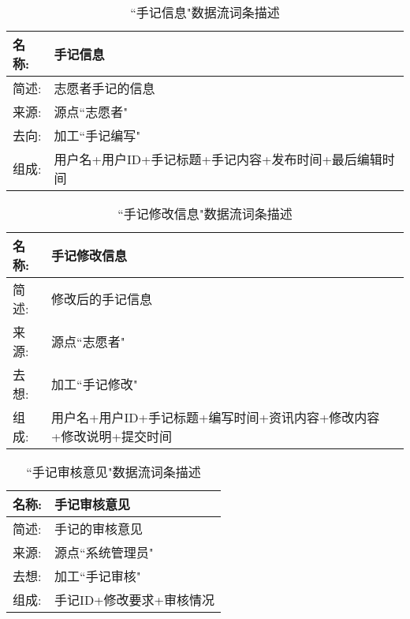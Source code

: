 \begin{table}[H]  
\caption{``手记信息"数据流词条描述}  
\begin{center}  
    \begin{tabular}{l p{11cm}} 
        \hline
        \quad 名称:  &  手记信息 \\
        \hline
        \quad 简述:  & 志愿者手记的信息 \\
        \hline
        \quad 来源:  & 源点``志愿者" \\
        \hline
        \quad 去向:  & 加工``手记编写" \\
        \hline
        \quad 组成:  & 用户名+用户ID+手记标题+手记内容+发布时间+最后编辑时间 \\
        \hline
    \end{tabular}
    \label{tab1}
\end{center}
\end{table}

\begin{table}[H]  
\caption{``手记修改信息"数据流词条描述}  
\begin{center}  
    \begin{tabular}{l p{11cm}} 
        \hline
        \quad 名称:  &   手记修改信息 \\
        \hline
        \quad 简述:  & 修改后的手记信息 \\
        \hline
        \quad 来源:  & 源点``志愿者" \\
        \hline
        \quad 去想:  & 加工``手记修改" \\
        \hline
        \quad 组成:  & 用户名+用户ID+手记标题+编写时间+资讯内容+修改内容+修改说明+提交时间 \\
        \hline
    \end{tabular}
    \label{tab1}
\end{center}
\end{table}

\begin{table}[H]  
\caption{``手记审核意见"数据流词条描述}  
\begin{center}  
    \begin{tabular}{l p{11cm}} 
        \hline
        \quad 名称:  &   手记审核意见 \\
        \hline
        \quad 简述:  & 手记的审核意见 \\
        \hline
        \quad 来源:  & 源点``系统管理员" \\
        \hline
        \quad 去想:  & 加工``手记审核" \\
        \hline
        \quad 组成:  & 手记ID+修改要求+审核情况 \\
        \hline
    \end{tabular}
    \label{tab1}
\end{center}
\end{table}

